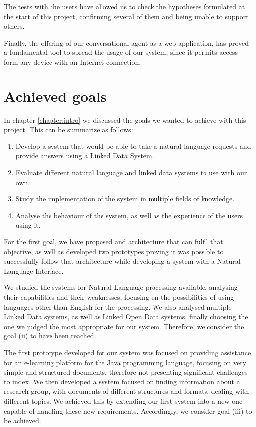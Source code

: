 The tests with the users have allowed us to check the hypotheses formulated at the start of this project, confirming several of them and being unable to support others.

Finally, the offering of our conversational agent as a web application, has proved a fundamental tool to spread the usage of our system, since it permits access form any device with an Internet connection.

\section{Achieved goals}

In chapter \ref{chapter:intro} we discussed the goals we wanted to achieve with this project. This can be summarize as follows:

\begin{enumerate}[label=(\roman*)]
 \item Develop a system that would be able to take a natural language requests and provide answers using a Linked Data System.
 \item Evaluate different natural language and linked data systems to use with our own.
 \item Study the implementation of the system in multiple fields of knowledge.
 \item Analyse the behaviour of the system, as well as the experience of the users using it.
\end{enumerate}

For the first goal, we have proposed and architecture that can fulfil that objective, as well as developed two prototypes proving it was possible to successfully follow that architecture while developing a system with a Natural Language Interface.

We studied the systems for Natural Language processing available, analysing their capabilities and their weaknesses, focusing on the possibilities of using languages other than English for the processing. We also analysed multiple Linked Data systems, as well as Linked Open Data systems, finally choosing the one we judged the most appropriate for our system. Therefore, we consider the goal (ii) to have been reached.

The first prototype developed for our system was focused on providing assistance for an e-learning platform for the Java programming language, focusing on very simple and structured documents, therefore not presenting significant challenges to index. We then developed a system focused on finding information about a research group, with documents of different structures and formats, dealing with different topics. We achieved this by extending our first system into a new one capable of handling these new requirements. Accordingly, we consider goal (iii) to be achieved.

